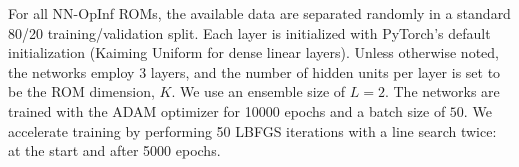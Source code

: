 \documentclass[3p,computermodern,11pt]{elsarticle}
\numberwithin{equation}{section}
\begin{document}
For all NN-OpInf ROMs, the available data are separated randomly 
in a standard 80/20 training/validation split. Each layer is initialized with PyTorch's default initialization (Kaiming Uniform for dense linear layers).
Unless otherwise noted, the networks employ 3 layers, and the number of hidden units per layer is set to be the ROM dimension, $K$. We use an ensemble size of $L=2$. The networks are trained with the ADAM optimizer for 10000 epochs and a batch size of $50$. We accelerate training by performing 50 LBFGS iterations with a line search twice: at the start and after 5000 epochs.
\end{document}
